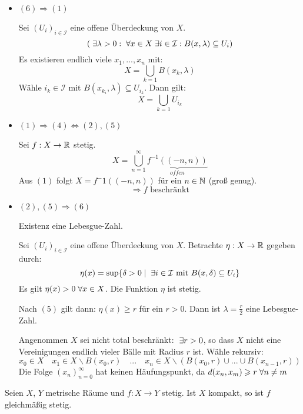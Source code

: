 \documentclass[main.tex]{subfiles}
\begin{document}
\begin{Beweis}
  \begin{itemize}
    \item $(6) \Rightarrow (1)$

      Sei $(U_i)_{i \in \mathcal{I}}$ eine offene Überdeckung von $X$.
      $$(\;\exists \lambda > 0 : \;\forall x \in X \;\exists i \in \mathcal{I} : B(x ,\lambda) \subseteq U_i)$$
      Es existieren endlich viele $x_1, ..., x_n$ mit:
      $$X = \bigcup_{k = 1} B(x_k, \lambda)$$
      Wähle $i_k \in \mathcal{I}$ mit $B(x_{k_i}, \lambda) \subseteq U_{i_k}$. Dann gilt:
      $$X = \bigcup_{k = 1} U_{i_k}$$
    \item $(1) \Rightarrow (4) \Leftrightarrow (2),(5)$

      Sei $f: X \to \mathbb{R}$ stetig.
      $$X = \bigcup_{n = 1}^\infty \underbrace{f^{-1}((-n,n))}_{offen}$$
      Aus $(1)$ folgt $X = f^-1((-n,n))$ für ein $n \in \mathbb{N}$ (groß genug).
      $$\Rightarrow f \text{ beschränkt}$$
    \item $(2),(5) \Rightarrow (6)$

    Existenz eine Lebesgue-Zahl.

    Sei $(U_i)_{i \in \mathcal{I}}$ eine offene Überdeckung von $X$. Betrachte $\eta : X \to \mathbb{R}$ gegeben durch:
    $$\eta(x) = \sup \{\delta > 0 \mid \;\exists i \in \mathcal{I} \text{ mit } B(x,\delta) \subseteq U_i \}$$
    Es gilt $\eta(x) > 0 \;\forall x \in X$. Die Funktion $\eta$ ist stetig.

    Nach $(5)$ gilt dann: $\eta(x) \geq r$ für ein $r > 0$. Dann ist $\lambda = \frac{r}{2}$ eine Lebesgue-Zahl.

    Angenommen $X$ sei nicht total beschränkt: $\;\exists r > 0$, so dass $X$ nicht eine Vereinigungen endlich vieler Bälle mit Radius $r$ ist. Wähle rekursiv:
    $$x_0 \in X \quad x_1 \in X \backslash B(x_0,r) \quad ... \quad x_n \in X \backslash (B(x_0,r) \cup ... \cup B(x_{n-1},r))$$
    Die Folge $(x_n)_{n=0}^\infty$ hat keinen Häufungspunkt, da $d(x_n,x_m) \geqslant r \;\forall n \neq m$
  \end{itemize}
\end{Beweis}

\begin{Theorem}
  Seien $X$, $Y$ metrische Räume und $f: X \to Y$ stetig. Ist $X$ kompakt, so ist $f$ gleichmäßig stetig.
\end{Theorem}
\end{document}

